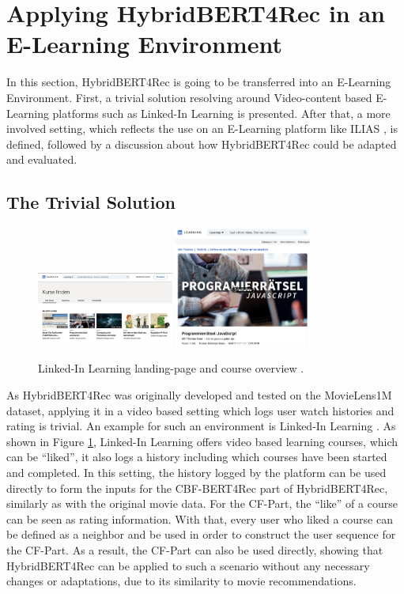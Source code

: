 \documentclass{Academic}
\begin{document}
    \section{Applying HybridBERT4Rec in an E-Learning Environment}
    In this section, HybridBERT4Rec is going to be transferred into an E-Learning Environment. First, a trivial solution resolving around Video-content based E-Learning platforms such as Linked-In Learning \cite{LinkedInLearningMit} is presented. After that, a more involved setting, which reflects the use on an E-Learning platform like ILIAS \cite{Ilias}, is defined, followed by a discussion about how HybridBERT4Rec could be adapted and evaluated.

        \subsection{The Trivial Solution}
        \begin{figure}[ht!]
            \centering
			\includegraphics[width=0.4\textwidth]{images/linked_in_landing.pdf}
            \includegraphics[width=0.4\textwidth]{images/linked_in_course.pdf}
			\caption{Linked-In Learning landing-page and course overview \cite{LinkedInLearningMit}.}
            \label{fig:trivSol}
		\end{figure}
        As HybridBERT4Rec was originally developed and tested on the MovieLens1M \cite{MovieLens1MDataset2015} dataset, applying it in a video based setting which logs user watch histories and rating is trivial. An example for such an environment is Linked-In Learning \cite{LinkedInLearningMit}. As shown in Figure \ref{fig:trivSol}, Linked-In Learning offers video based learning courses, which can be \enquote{liked}, it also logs a history including which courses have been started and completed. In this setting, the history logged by the platform can be used directly to form the inputs for the CBF-BERT4Rec part of HybridBERT4Rec, similarly as with the original movie data. For the CF-Part, the \enquote{like} of a course can be seen as rating information. With that, every user who liked a course can be defined as a neighbor and be used in order to construct the user sequence for the CF-Part. As a result, the CF-Part can also be used directly, showing that HybridBERT4Rec can be applied to such a scenario without any necessary changes or adaptations, due to its similarity to movie recommendations.
    
\end{document}

